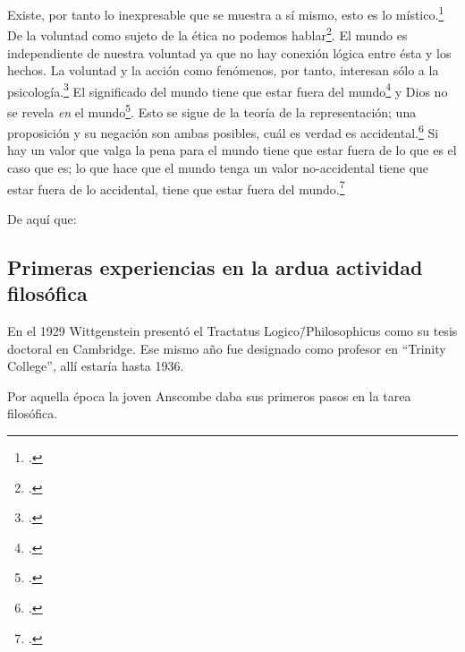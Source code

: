 Existe, por tanto lo inexpresable que se muestra a sí mismo, esto es lo
místico.\footcite[cf.~][6.522]{tractatus}
De la voluntad como sujeto de la ética no podemos
hablar\footcite[cf.~][6.423]{tractatus}. El mundo es independiente de nuestra
voluntad ya que no hay conexión lógica entre ésta y los hechos.
La voluntad y la acción como fenómenos, por tanto, interesan sólo a la
psicología.\footcite[cf.~][p.171 \S3]{IWT}
El significado del mundo tiene que estar fuera del
mundo\footcite[cf.~][6.41]{tractatus} y Dios no se revela \emph{en} el
mundo\footcite[cf.~][6.432]{tractatus}. 
Esto se sigue de la teoría de la representación; una proposición y su negación
son ambas posibles, cuál es verdad es accidental.\footcite[cf.~][p.170 \S4]{IWT}
Si hay un valor que valga la pena para el mundo tiene que estar fuera de lo que
es el caso que es; lo que hace que el mundo tenga un valor no-accidental tiene
que estar fuera de lo accidental, tiene que estar fuera del
mundo.\footcite[cf.~][6.41]{tractatus} 

De aquí que:

\subsection{Primeras experiencias en la ardua actividad filosófica}
En el 1929 Wittgenstein presentó el Tractatus Logico\=/Philosophicus como su
tesis doctoral en Cambridge. Ese mismo año fue designado como profesor en
``Trinity College'', allí estaría hasta 1936.

Por aquella época la joven Anscombe daba sus primeros pasos en la tarea
filosófica. 


